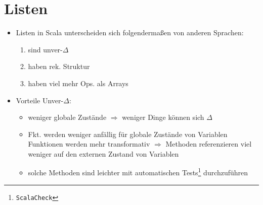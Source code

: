 \section{Listen}
\begin{itemize}
  \item Listen in Scala unterscheiden sich folgendermaßen von
  anderen Sprachen: \begin{enumerate}
    \item sind unver-$\Delta$
    \item haben rek. Struktur
    \item haben viel mehr Ops. als Arrays
  \end{enumerate}
  
  
  
  \item Vorteile Unver-$\Delta$:
  \begin{itemize}
    \item weniger globale Zustände $\Rightarrow$ weniger Dinge können 
    sich $\Delta$
    \item Fkt. werden weniger anfällig für globale Zustände von Variablen 
    \und Funktionen werden mehr transformativ $\Rightarrow$ Methoden
    referenzieren viel weniger auf den externen Zustand von Variablen
    \item solche Methoden sind leichter mit automatischen 
    Tests\footnote{\texttt{ScalaCheck}} durchzuführen
  \end{itemize}
\end{itemize}


